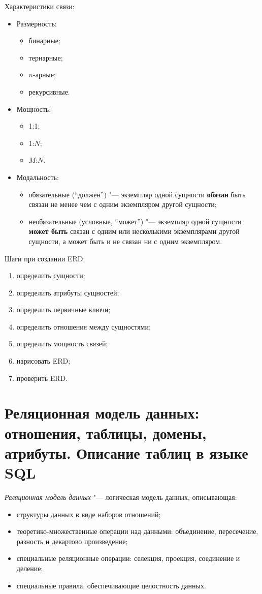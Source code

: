 Характеристики связи:
\begin{itemize}
	\item Размерность:
		\begin{itemize}
			\item бинарные;
			\item тернарные;
			\item $ n $-арные;
			\item рекурсивные.
		\end{itemize}
	\item Мощность:
		\begin{itemize}
			\item 1:1;
			\item 1:$ N $;
			\item $ M $:$ N $.
		\end{itemize}
	\item Модальность:
		\begin{itemize}
			\item обязательные (``должен'') "--- экземпляр одной сущности \textbf{обязан} быть связан не менее чем с одним экземпляром другой сущности;
			\item необязательные (условные, ``может'') "--- экземпляр одной сущности \textbf{может быть} связан с одним или несколькими экземплярами другой сущности, а может быть и не связан ни с одним экземпляром.
		\end{itemize}
\end{itemize}

Шаги при создании ERD:
\begin{enumerate}
	\item определить сущности;
	\item определить атрибуты сущностей;
	\item определить первичные ключи;
	\item определить отношения между сущностями;
	\item определить мощность связей;
	\item нарисовать ERD;
	\item проверить ERD.
\end{enumerate}

\section{Реляционная модель данных: отношения, таблицы, домены, атрибуты. Описание таблиц в языке SQL}

\begin{definition}
	\emph{Реляционная модель данных} "--- логическая модель данных, описывающая:
	\begin{itemize}
		\item структуры данных в виде наборов отношений;
		\item теоретико-множественные операции над данными: объединение, пересечение, разность и декартово произведение;
		\item специальные реляционные операции: селекция, проекция, соединение и деление;
		\item специальные правила, обеспечивающие целостность данных.
	\end{itemize}
\end{definition}

